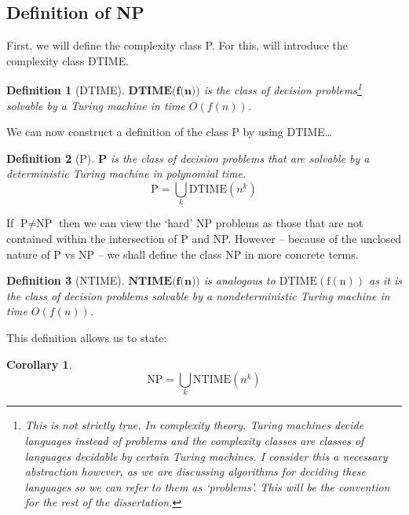 \documentclass[11pt]{article}
\newtheorem{definition}{Definition}
\newtheorem{corollary}{Corollary}
\theoremstyle{definition}
\begin{document}
    \subsection{Definition of NP}
      First, we will define the complexity class P. For this, will introduce the complexity class DTIME.
      \begin{definition}[DTIME]
        $\mathrm{\textbf{DTIME(f(n))}}$ is the class of decision problems\footnote{This is not strictly true. In complexity theory, Turing machines decide \emph{languages} instead of problems and the complexity classes are classes of languages decidable by certain Turing machines. I consider this a necessary abstraction however, as we are discussing algorithms for deciding these languages so we can refer to them as `problems'. This will be the convention for the rest of the dissertation.} solvable by a Turing machine in time $O(f(n))$.  
      \end{definition}
      We can now construct a definition of the class P by using DTIME\ldots
      \begin{definition}[P]
        $\mathrm{\textbf{P}}$ is the class of decision problems that are solvable by a deterministic Turing machine in polynomial
        time.
        \begin{equation}
          \mathrm{P} = \bigcup_{k}\mathrm{DTIME}(n^{k})
        \end{equation}
      \end{definition} 

      If $\text{P} \neq \text{NP}$ then we can view the `hard' NP problems as those that are not
      contained within the intersection of
      P and NP. However -- because of the unclosed nature of P vs NP -- we shall define the class NP in more concrete
      terms.
 
      \begin{definition}[NTIME]
        $\mathrm{\textbf{NTIME(f(n))}}$ is analogous to $\mathrm{DTIME(f(n))}$ as it is the class of decision problems solvable by
        a nondeterministic Turing machine in time $O(f(n))$. 
      \end{definition}   
      This definition allows us to state: 
 
      \begin{corollary}
        \begin{equation} \label{eq:NPproblems}
           \mathrm{NP} = \bigcup_{k}\mathrm{NTIME}(n^{k})
        \end{equation}
      \end{corollary}
    
\end{document}
